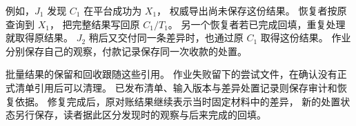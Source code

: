 例如，$J_1$ 发现 $C_1$ 在平台成功为 $X_1$，
权威导出尚未保存这份结果。
恢复者按原  查询到 $X_1$，
把完整结果写回原 $C_1/T_1$。
另一个恢复者若已完成回填，重复处理就取得原结果。
$J_2$ 稍后又交付同一条差异时，也通过原 $C_1$ 取得这份结果。
作业分别保存自己的观察，付款记录保存同一次收款的处置。


批量结果的保留和回收跟随这些引用。
作业失败留下的尝试文件，在确认没有正式清单引用后可以清理。
已发布清单、输入版本与差异处置记录则保存审计和恢复依据。
修复完成后，原对账结果继续表示当时固定材料中的差异，
新的处置状态另行保存，读者据此区分发现时的观察与后来完成的回填。
